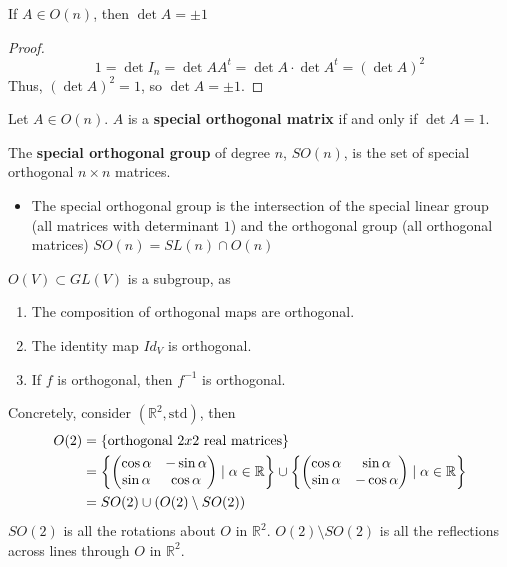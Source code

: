 \documentclass[letterpaper,12pt]{article}
\begin{document}
\begin{corollary}
If $A \in O(n)$, then $\det{A} = \pm 1$
\end{corollary}
\begin{proof}
\begin{equation*}
    1 = \det{I_n} = \det{AA^t} = \det{A} \cdot \det{A^t} = (\det{A})^2
\end{equation*}
Thus, $(\det{A})^2 = 1$, so $\det{A} = \pm 1$.
\end{proof}

\begin{definition}
Let $A \in O(n)$. $A$ is a \textbf{special orthogonal matrix} if and only if $\det{A} = 1$.
\end{definition}

\begin{definition}
The \textbf{special orthogonal group} of degree $n$, $SO(n)$, is the set of special orthogonal $n \times n$ matrices.
\begin{itemize}
    \item The special orthogonal group is the intersection of the special linear group (all matrices with determinant $1$) and the orthogonal group (all orthogonal matrices) $SO(n) = SL(n) \cap O(n)$
\end{itemize}
\end{definition}

\begin{corollary}
$O(V) \subset GL(V)$ is a subgroup, as
\begin{enumerate}
    \item The composition of orthogonal maps are orthogonal.
    \item The identity map $Id_{V}$ is orthogonal.
    \item If $f$ is orthogonal, then $f^{-1}$ is orthogonal.
\end{enumerate}
\end{corollary}

Concretely, consider $(\mathbb{R}^2, \text{std})$, then
\begin{align*}
    O(2) & = \left\{ \text{orthogonal $2x2$ real matrices} \right\} \\
    & = \left\{ \begin{pmatrix} \cos{\alpha} & -\sin{\alpha} \\ \sin{\alpha} & \cos{\alpha} \end{pmatrix} \mid \alpha \in \mathbb{R} \right\} \cup \left\{ \begin{pmatrix} \cos{\alpha} & \sin{\alpha} \\ \sin{\alpha} & -\cos{\alpha} \end{pmatrix} \mid \alpha \in \mathbb{R} \right\} \\
    & = SO(2) \cup (O(2) \setminus SO(2))
\end{align*}
$SO(2)$ is all the rotations about $O$ in $\mathbb{R}^2$. $O(2) \setminus SO(2)$ is all the reflections across lines through $O$ in $\mathbb{R}^2$.
\end{document}
